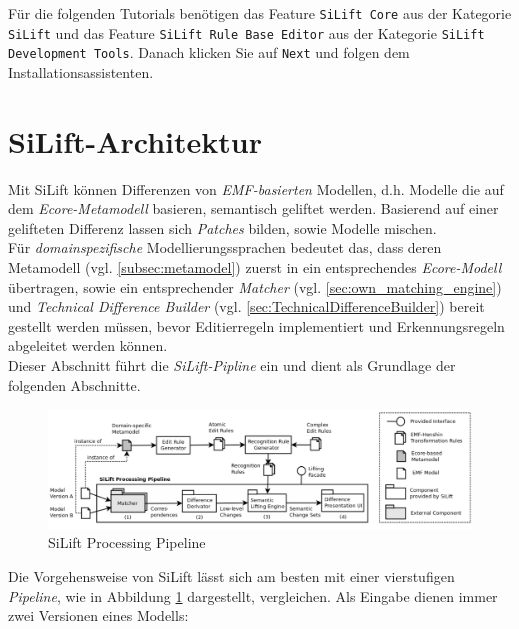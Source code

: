 \documentclass[a4paper]{scrartcl}
\begin{document}
Für die folgenden Tutorials benötigen das Feature \texttt{SiLift Core} aus der Kategorie \texttt{SiLift} und das Feature \texttt{SiLift Rule Base Editor} aus der Kategorie \texttt{SiLift Development Tools}. Danach klicken Sie auf \texttt{Next} und folgen dem Installationsassistenten.\\

\section{SiLift-Architektur}\label{silift_architecture}
Mit SiLift können Differenzen von \textit{EMF-basierten} Modellen, d.h. Modelle die auf dem \textit{Ecore-Metamodell} basieren, semantisch geliftet werden. Basierend auf einer gelifteten Differenz lassen sich \textit{Patches} bilden, sowie Modelle mischen.\\
Für \textit{domainspezifische} Modellierungssprachen bedeutet das, dass deren Metamodell (vgl. \ref{subsec:metamodel}) zuerst in ein entsprechendes \textit{Ecore-Modell} übertragen, sowie ein entsprechender \textit{Matcher} (vgl. \ref{sec:own_matching_engine}) und \textit{Technical Difference Builder} (vgl. \ref{sec:TechnicalDifferenceBuilder}) bereit gestellt werden müssen, bevor Editierregeln implementiert und Erkennungsregeln abgeleitet werden können.\\
Dieser Abschnitt führt die \textit{SiLift-Pipline} ein und dient als Grundlage der folgenden Abschnitte.


\begin{figure}[H]
\centering
\includegraphics[width=\textwidth]{graphics/silift-processing_pipeline.png}
\caption{SiLift Processing Pipeline}
\label{silift-processing_pipeline}
\end{figure}

Die Vorgehensweise von SiLift lässt sich am besten mit einer vierstufigen \textit{Pipeline}, wie in Abbildung \ref{silift-processing_pipeline} dargestellt,  vergleichen.
Als Eingabe dienen immer zwei Versionen eines Modells:
\end{document}
